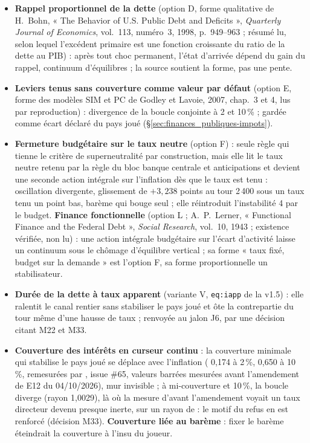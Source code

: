 \documentclass[11pt,a4paper]{article}
\newcommand{\code}[1]{\texttt{\detokenize{#1}}}
\newcommand{\barre}[1]{\leavevmode\sbox{\boitebarre}{#1}\rlap{\rule[0.6ex]{\wd\boitebarre}{0.4pt}}\usebox{\boitebarre}}
\begin{document}
\begin{itemize}
\item \textbf{Rappel proportionnel de la dette} (option D, forme qualitative de H.~Bohn, « The Behavior of U.S. Public Debt and Deficits », \emph{Quarterly Journal of Economics}, vol.~113, numéro~3, 1998, p.~949--963 ; résumé lu, selon lequel l'excédent primaire est une fonction croissante du ratio de la dette au PIB) : après tout choc permanent, l'état d'arrivée dépend du gain du rappel, continuum d'équilibres ; la source soutient la forme, pas une pente.
\item \textbf{Leviers tenus sans couverture comme valeur par défaut} (option E, forme des modèles SIM et PC de Godley et Lavoie, 2007, chap.~3 et 4, lus par reproduction) : divergence de la boucle conjointe à 2 et 10\,\% ; gardée comme écart déclaré du pays joué (\S\ref{sec:finances_publiques-impots}).
\item \textbf{Fermeture budgétaire sur le taux neutre} (option F) : seule règle qui tienne le critère de superneutralité par construction, mais elle lit le taux neutre retenu par la règle du bloc banque centrale et anticipations et devient une seconde action intégrale sur l'inflation dès que le taux est tenu : oscillation divergente, glissement de $+3{,}238$ points au tour 2\,400 sous un taux tenu un point bas, barème qui bouge seul ; elle réintroduit l'instabilité 4 par le budget. \textbf{Finance fonctionnelle} (option L ; A.~P.~Lerner, « Functional Finance and the Federal Debt », \emph{Social Research}, vol.~10, 1943 ; existence vérifiée, non lu) : une action intégrale budgétaire sur l'écart d'activité laisse un continuum sous le chômage d'équilibre vertical ; sa forme « taux fixé, budget sur la demande » est l'option F, sa forme proportionnelle un stabilisateur.
\item \textbf{Durée de la dette à taux apparent} (variante V, \texttt{eq:iapp} de la v1.5) : elle ralentit le canal rentier sans stabiliser le pays joué et ôte la contrepartie du tour même d'une hausse de taux ; renvoyée au jalon J6, par une décision citant M22 et M33.
\item \textbf{Couverture des intérêts en curseur continu} : la couverture minimale qui stabilise le pays joué se déplace avec l'inflation (\barre{0,131} 0,174 à 2\,\%, \barre{0,487} 0,650 à 10\,\%, remesurées par \code{outils/maquette_conjointe.py}, issue \#65, valeurs barrées mesurées avant l'amendement de E12 du 04/10/2026), mur invisible ; à mi-couverture et 10\,\%, la boucle diverge (rayon 1,0029), là où la mesure d'avant l'amendement voyait un taux directeur devenu presque inerte, sur un rayon de \barre{0,999488} : le motif du refus en est renforcé (décision M33). \textbf{Couverture liée au barème} : fixer le barème éteindrait la couverture à l'insu du joueur.

\end{itemize}
\end{document}

